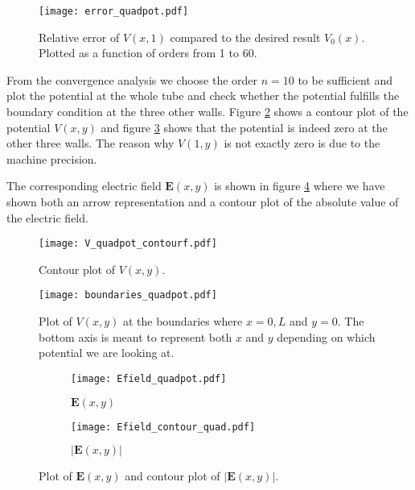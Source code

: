 \documentclass{article}
\begin{document}
\begin{figure}[!htb]
\centering
\texttt{[image: error\_quadpot.pdf]}{}
\caption{Relative error of $V(x,1)$ compared to the desired result $V_0(x)$. Plotted as a function of orders from 1 to 60. }
\label{fig: error_quadpot}
\end{figure}

From the convergence analysis we choose the order $n=10$ to be sufficient and plot the potential at the whole tube and check whether the potential fulfills the boundary condition at the three other walls. Figure \ref{fig: V_quadpot_contourf} shows a contour plot of the potential $V(x,y)$ and figure \ref{fig: boundaries_quadpot} shows that the potential is indeed zero at the other three walls. The reason why $V(1,y)$ is not exactly zero is due to the machine precision.

The corresponding electric field $\boldsymbol{E}(x,y)$ is shown in figure \ref{fig: Efield_quadpot} where we have shown both an arrow representation and a contour plot of the absolute value of the electric field. 

\begin{figure}[!htb]
\centering
\texttt{[image: V\_quadpot\_contourf.pdf]}{}
\caption{Contour plot of $V(x,y)$.}
\label{fig: V_quadpot_contourf}
\end{figure}

\begin{figure}[!htb]
\centering
\texttt{[image: boundaries\_quadpot.pdf]}{}
\caption{Plot of $V(x,y)$ at the boundaries where $x=0,L$ and $y=0$. The bottom axis is meant to represent both $x$ and $y$ depending on which potential we are looking at. }
\label{fig: boundaries_quadpot}
\end{figure}

\begin{figure}[!htbp]
     \centering
     \begin{subfigure}[b]{0.4\textwidth}
         \centering
         \texttt{[image: Efield\_quadpot.pdf]}
         \caption{$\boldsymbol{E}(x,y)$}
     \end{subfigure}
    \hspace{6em}
     \begin{subfigure}[b]{0.4\textwidth}
         \centering
         \texttt{[image: Efield\_contour\_quad.pdf]}
         \caption{$|\boldsymbol{E}(x,y)|$}
     \end{subfigure}
    \caption{Plot of $\boldsymbol{E}(x,y)$ and contour plot of $|\boldsymbol{E}(x,y)|$.}
    \label{fig: Efield_quadpot}
\end{figure}
\FloatBarrier
\end{document}
